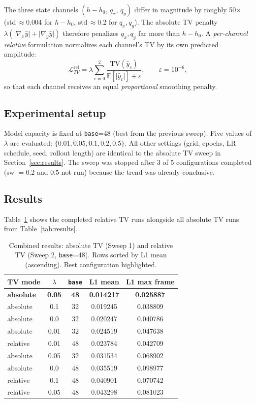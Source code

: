 \documentclass[11pt,a4paper]{article}
\begin{document}
The three state channels $(h-h_0,\,q_x,\,q_y)$ differ in magnitude by roughly 50$\times$
(std$\,\approx 0.004$ for $h-h_0$, std$\,\approx 0.2$ for $q_x,q_y$).
The absolute TV penalty $\lambda(\lvert\nabla_x\hat{y}\rvert+\lvert\nabla_y\hat{y}\rvert)$
therefore penalizes $q_x,q_y$ far more than $h-h_0$.
A \emph{per-channel relative} formulation normalizes each channel's TV by its own predicted amplitude:
\begin{equation}
  \mathcal{L}_{TV}^{\text{rel}} = \lambda \sum_{c=0}^{2}
  \frac{\mathrm{TV}(\hat{y}_c)}{\mathbb{E}[\lvert\hat{y}_c\rvert] + \varepsilon},
  \qquad \varepsilon = 10^{-6},
\end{equation}
so that each channel receives an equal \emph{proportional} smoothing penalty.

\subsection{Experimental setup}

Model capacity is fixed at \texttt{base}=48 (best from the previous sweep).
Five values of $\lambda$ are evaluated: $\{0.01, 0.05, 0.1, 0.2, 0.5\}$.
All other settings (grid, epochs, LR schedule, seed, rollout length) are identical to
the absolute TV sweep in Section~\ref{sec:results}.
The sweep was stopped after 3 of 5 configurations completed (sw $= 0.2$ and $0.5$ not run)
because the trend was already conclusive.

\subsection{Results}

Table~\ref{tab:rel_results} shows the completed relative TV runs alongside all
absolute TV runs from Table~\ref{tab:results}.

\begin{table}[H]
  \centering
  \caption{Combined results: absolute TV (Sweep 1) and relative TV (Sweep 2, \texttt{base}=48).
           Rows sorted by L1 mean (ascending). Best configuration highlighted.}
  \label{tab:rel_results}
  \begin{tabular}{lcccc}
    \toprule
    TV mode & $\lambda$ & \texttt{base} & L1 mean & L1 max frame \\
    \midrule
    \textbf{absolute} & \textbf{0.05} & \textbf{48} & \textbf{0.014217} & \textbf{0.025887} \\
    absolute & 0.1  & 32 & 0.019245 & 0.038809 \\
    absolute & 0.0  & 32 & 0.020247 & 0.040786 \\
    absolute & 0.01 & 32 & 0.024519 & 0.047638 \\
    relative & 0.01 & 48 & 0.023784 & 0.042709 \\
    absolute & 0.05 & 32 & 0.031534 & 0.068902 \\
    absolute & 0.0  & 48 & 0.035519 & 0.098977 \\
    relative & 0.1  & 48 & 0.040901 & 0.070742 \\
    relative & 0.05 & 48 & 0.043298 & 0.081023 \\
    \bottomrule
  \end{tabular}
\end{table}
\end{document}
